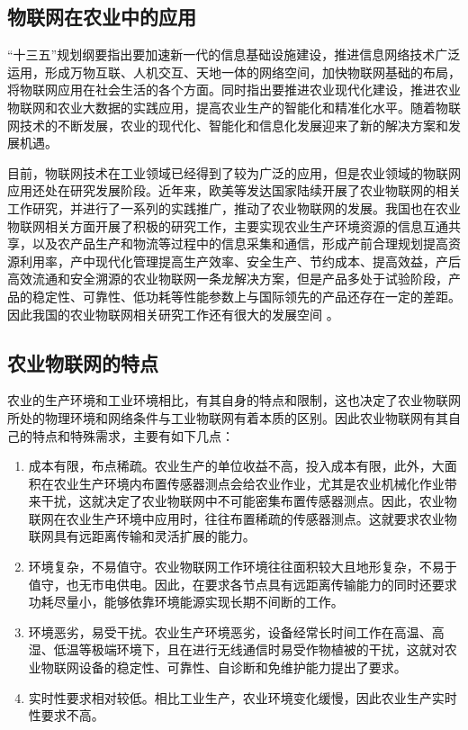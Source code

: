 	\subsection{物联网在农业中的应用}
“十三五”规划纲要指出要加速新一代的信息基础设施建设，推进信息网络技术广泛运用，形成万物互联、人机交互、天地一体的网络空间，加快物联网基础的布局，将物联网应用在社会生活的各个方面。同时指出要推进农业现代化建设，推进农业物联网和农业大数据的实践应用，提高农业生产的智能化和精准化水平。随着物联网技术的不断发展，农业的现代化、智能化和信息化发展迎来了新的解决方案和发展机遇。
	
目前，物联网技术在工业领域已经得到了较为广泛的应用，但是农业领域的物联网应用还处在研究发展阶段。近年来，欧美等发达国家陆续开展了农业物联网的相关工作研究，并进行了一系列的实践推广，推动了农业物联网的发展。我国也在农业物联网相关方面开展了积极的研究工作，主要实现农业生产环境资源的信息互通共享，以及农产品生产和物流等过程中的信息采集和通信，形成产前合理规划提高资源利用率，产中现代化管理提高生产效率、安全生产、节约成本、提高效益，产后高效流通和安全溯源的农业物联网一条龙解决方案，但是产品多处于试验阶段，产品的稳定性、可靠性、低功耗等性能参数上与国际领先的产品还存在一定的差距。因此我国的农业物联网相关研究工作还有很大的发展空间\supercite{ChenWei2013} 。
	
	\subsection{农业物联网的特点}
农业的生产环境和工业环境相比，有其自身的特点和限制，这也决定了农业物联网所处的物理环境和网络条件与工业物联网有着本质的区别。因此农业物联网有其自己的特点和特殊需求，主要有如下几点：
	\begin{enumerate}
  			\item 成本有限，布点稀疏。农业生产的单位收益不高，投入成本有限，此外，大面积在农业生产环境内布置传感器测点会给农业作业，尤其是农业机械化作业带来干扰，这就决定了农业物联网中不可能密集布置传感器测点。因此，农业物联网在农业生产环境中应用时，往往布置稀疏的传感器测点。这就要求农业物联网具有远距离传输和灵活扩展的能力。
  			\item 环境复杂，不易值守。农业物联网工作环境往往面积较大且地形复杂，不易于值守，也无市电供电。因此，在要求各节点具有远距离传输能力的同时还要求功耗尽量小，能够依靠环境能源实现长期不间断的工作。
  			\item 环境恶劣，易受干扰。农业生产环境恶劣，设备经常长时间工作在高温、高湿、低温等极端环境下，且在进行无线通信时易受作物植被的干扰，这就对农业物联网设备的稳定性、可靠性、自诊断和免维护能力提出了要求。
  			\item 实时性要求相对较低。相比工业生产，农业环境变化缓慢，因此农业生产实时性要求不高。
	\end{enumerate}


